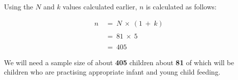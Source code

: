 \documentclass[12pt,a4paper]{article}
\theoremstyle{definition}
\theoremstyle{definition}
\theoremstyle{definition}
\theoremstyle{remark}
\begin{document}
Using the \(N\) and \(k\) values calculated earlier, \(n\) is calculated
as follows:

\[ \begin{aligned}
n ~ & = ~ N ~ \times ~ (1 ~ + ~ k)\\
\\
& = ~ 81 ~ \times ~ 5 \\
\\
& = ~ 405
\end{aligned} \]

We will need a sample size of about \textbf{405} children about
\textbf{81} of which will be children who are practising appropriate
infant and young child feeding.

\newpage

\renewcommand\refname{References}

\end{document}
